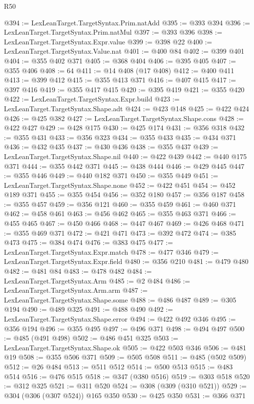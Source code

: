 \begin{lexlean}{R50}
\begin{coremodule}
@394 := LexLeanTarget.TargetSyntax.Prim.natAdd
@395 := @393 @394
@396 := LexLeanTarget.TargetSyntax.Prim.natMul
@397 := @393 @396
@398 := LexLeanTarget.TargetSyntax.Expr.value
@399 := @398 @22
@400 := LexLeanTarget.TargetSyntax.Value.nat
@401 := @400 @84
@402 := @399 @401
@404 := @355 @402 @371
@405 := @368 @404
@406 := @395 @405
@407 := @355 @406
@408 := 64
@411 := @14 @408 (@17 @408)
@412 := @400 @411
@413 := @399 @412
@415 := @355 @413 @371
@416 := @407 @415
@417 := @397 @416
@419 := @355 @417 @415
@420 := @395 @419
@421 := @355 @420
@422 := LexLeanTarget.TargetSyntax.Expr.build
@423 := LexLeanTarget.TargetSyntax.Shape.adt
@424 := @423 @148
@425 := @422 @424
@426 := @425 @382
@427 := LexLeanTarget.TargetSyntax.Shape.cons
@428 := @422 @427
@429 := @428 @175
@430 := @425 @174
@431 := @356 @318
@432 := @355 @431
@433 := @356 @323
@434 := @355 @433
@435 := @434 @371
@436 := @432 @435
@437 := @430 @436
@438 := @355 @437
@439 := LexLeanTarget.TargetSyntax.Shape.nil
@440 := @422 @439
@442 := @440 @175 @371
@444 := @355 @442 @371
@445 := @438 @444
@446 := @429 @445
@447 := @355 @446
@449 := @440 @182 @371
@450 := @355 @449
@451 := LexLeanTarget.TargetSyntax.Shape.none
@452 := @422 @451
@454 := @452 @189 @371
@455 := @355 @454
@456 := @352 @180
@457 := @356 @187
@458 := @355 @457
@459 := @356 @121
@460 := @355 @459
@461 := @460 @371
@462 := @458 @461
@463 := @456 @462
@465 := @355 @463 @371
@466 := @455 @465
@467 := @450 @466
@468 := @447 @467
@469 := @426 @468
@471 := @355 @469 @371
@472 := @421 @471
@473 := @392 @472
@474 := @385 @473
@475 := @384 @474
@476 := @383 @475
@477 := LexLeanTarget.TargetSyntax.Expr.match
@478 := @477 @346
@479 := LexLeanTarget.TargetSyntax.Expr.field
@480 := @356 @210
@481 := @479 @480
@482 := @481 @84
@483 := @478 @482
@484 := LexLeanTarget.TargetSyntax.Arm
@485 := @2 @484
@486 := LexLeanTarget.TargetSyntax.Arm.arm
@487 := LexLeanTarget.TargetSyntax.Shape.some
@488 := @486 @487
@489 := @305 @194
@490 := @489 @325
@491 := @488 @490
@492 := LexLeanTarget.TargetSyntax.Shape.error
@494 := @422 @492 @346
@495 := @356 @194
@496 := @355 @495
@497 := @496 @371
@498 := @494 @497
@500 := @485 (@491 @498)
@502 := @486 @451 @325
@503 := LexLeanTarget.TargetSyntax.Shape.ok
@505 := @422 @503 @346
@506 := @481 @19
@508 := @355 @506 @371
@509 := @505 @508
@511 := @485 (@502 @509)
@512 := @26 @484
@513 := @511 @512
@514 := @500 @513
@515 := @483 @514
@516 := @476 @515
@518 := @347 (@380 @516)
@519 := @303 @518
@520 := @312 @325
@521 := @311 @520
@524 := @308 (@309 (@310 @521))
@529 := @304 (@306 (@307 @524)) @165 @350
@530 := @425 @350
@531 := @366 @371

\end{coremodule}
\end{lexlean}

